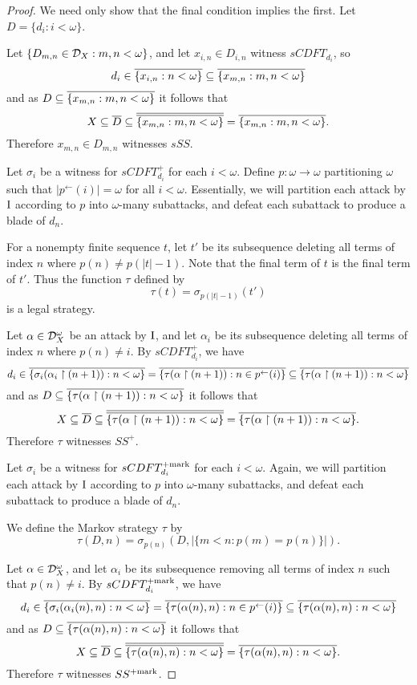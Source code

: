 \documentclass{amsart}
\theoremstyle{plain}
\theoremstyle{definition}
\theoremstyle{remark}
\theoremstyle{plain}
\theoremstyle{definition}
\theoremstyle{remark}
\begin{document}
\begin{proof}
  We need only show that the final condition implies the first.
  Let \(D=\{d_i:i<\omega\}\).

  Let \(\{D_{m,n}\in\mathcal{D}_X:m,n<\omega\}\), and let \(x_{i,n}\in D_{i,n}\)
  witness \(sCDFT_{d_i}\), so
  \[
    d_i
      \in
    \overline{\{x_{i,n}:n<\omega\}}
      \subseteq
    \overline{\{x_{m,n}:m,n<\omega\}}
  \]
  and as \(D\subseteq\overline{\{x_{m,n}:m,n<\omega\}}\)
  it follows that
  \[
    X
      \subseteq
    \overline{D}
      \subseteq
    \overline{\overline{\{x_{m,n}:m,n<\omega\}}}
      =
    \overline{\{x_{m,n}:m,n<\omega\}}
  .\]
  Therefore \(x_{m,n}\in D_{m,n}\) witnesses \(sSS\).

  Let \(\sigma_i\) be a witness for \(sCDFT_{d_i}^+\)
  for each \(i<\omega\). Define \(p:\omega\to\omega\) partitioning \(\omega\)
  such that \(|p^\leftarrow(i)|=\omega\) for all \(i<\omega\).
  Essentially, we will partition each
  attack by \(\mathrm{I}\) according to \(p\) into \(\omega\)-many subattacks, and
  defeat each subattack to produce a blade of \(d_n\).

  For a nonempty finite sequence \(t\), let \(t'\) be its subsequence deleting
  all terms of index \(n\) where \(p(n)\not=p(|t|-1)\).
  Note that the final term of \(t\) is the final term of \(t'\).
  Thus the function \(\tau\) defined by
  \[
    \tau(t)
      =
    \sigma_{p(|t|-1)}(t')
  \]
  is a legal strategy.

  Let \(\alpha\in\mathcal{D}_X^\omega\) be an attack by \(\mathrm{I}\),
  and let \(\alpha_i\) be its subsequence
  deleting all terms of index \(n\) where \(p(n)\not=i\).
  By \(sCDFT_{d_i}^+\), we have
  \[
    d_i
      \in
    \overline{\{\sigma_i(\alpha_i\restriction (n+1)):n<\omega\}}
      =
    \overline{\{\tau(\alpha\restriction(n+1)):n\in p^{\leftarrow}(i)\}}
      \subseteq
    \overline{\{\tau(\alpha\restriction(n+1)):n<\omega\}}
  \]
  and as \(D\subseteq\overline{\{\tau(\alpha\restriction(n+1)):n<\omega\}}\)
  it follows that
  \[
    X
      \subseteq
    \overline{D}
      \subseteq
    \overline{\overline{\{\tau(\alpha\restriction(n+1)):n<\omega\}}}
      =
    \overline{\{\tau(\alpha\restriction(n+1)):n<\omega\}}
  .\]
  Therefore \(\tau\) witnesses \(SS^+\).

  Let \(\sigma_i\) be a witness for \(sCDFT_{d_i}^{+\mathrm{mark}}\)
  for each \(i<\omega\).
  Again, we will partition each
  attack by \(\mathrm{I}\) according to \(p\) into \(\omega\)-many subattacks, and
  defeat each subattack to produce a blade of \(d_n\).

  We define the Markov strategy \(\tau\) by
  \[
    \tau(D,n)
      =
    \sigma_{p(n)}(D,|\{m< n:p(m)=p(n)\}|)
  .\]

  Let \(\alpha\in\mathcal{D}_X^\omega\), and let \(\alpha_i\) be its subsequence
  removing all terms of index \(n\) such that \(p(n)\not=i\).
  By \(sCDFT_{d_i}^{+\mathrm{mark}}\), we have
  \[
    d_i
      \in
    \overline{\{\sigma_i(\alpha_i(n),n):n<\omega\}}
      =
    \overline{\{\tau(\alpha(n),n):n\in p^{\leftarrow}(i)\}}
      \subseteq
    \overline{\{\tau(\alpha(n),n):n<\omega\}}
  \]
  and as \(D\subseteq\overline{\{\tau(\alpha(n),n):n<\omega\}}\)
  it follows that
  \[
    X
      \subseteq
    \overline{D}
      \subseteq
    \overline{\overline{\{\tau(\alpha(n),n):n<\omega\}}}
      =
    \overline{\{\tau(\alpha(n),n):n<\omega\}}
  .\]
  Therefore \(\tau\) witnesses \(SS^{+\mathrm{mark}}\).
\end{proof}
\end{document}
